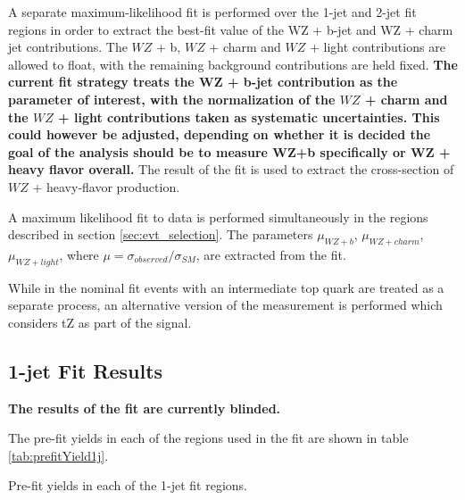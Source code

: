 
A separate maximum-likelihood fit is performed over the 1-jet and 2-jet fit regions in order to extract the best-fit value of the WZ + b-jet and WZ + charm jet contributions. The $WZ$ + b, $WZ$ + charm and $WZ$ + light contributions are allowed to float, with the remaining background contributions are held fixed. \textbf{The current fit strategy treats the WZ + b-jet contribution as the parameter of interest, with the normalization of the $WZ$ + charm and the $WZ$ + light contributions taken as systematic uncertainties. This could however be adjusted, depending on whether it is decided the goal of the analysis should be to measure WZ+b specifically or WZ + heavy flavor overall.} The result of the fit is used to extract the cross-section of $WZ$ + heavy-flavor production.

A maximum likelihood fit to data is performed simultaneously in the regions described in section \ref{sec:evt_selection}. The parameters $\mu_{WZ+b}$, $\mu_{WZ+charm}$, $\mu_{WZ+light}$, where $\mu = \sigma_{observed}/\sigma_{SM} $, are extracted from the fit.

While in the nominal fit events with an intermediate top quark are treated as a separate process, an alternative version of the measurement is performed which considers tZ as part of the signal.


\subsection{1-jet Fit Results}

\textbf{The results of the fit are currently blinded.} 

The pre-fit yields in each of the regions used in the fit are shown in table \ref{tab:prefitYield1j}.

\hspace{-1in}\begin{table}[H]
\begin{adjustwidth}{-3em}{-3em}
\small

\label{tab:prefitYield1j}
\caption{Pre-fit yields in each of the 1-jet fit regions.}
\end{adjustwidth}
\end{table}

